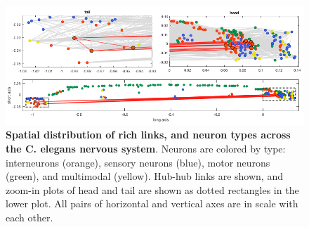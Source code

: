 \documentclass[10pt,letterpaper]{article}
\begin{document}
\begin{figure}[h]
\centering
    \includegraphics[width=1\textwidth]{SpatialPlot.png}
\caption{
\textbf{Spatial distribution of rich links, and neuron types across the C. elegans nervous system}.
Neurons are colored by type: interneurons (orange), sensory neurons (blue), motor neurons (green), and multimodal (yellow).
Hub-hub links are shown, and zoom-in plots of head and tail are shown as dotted rectangles in the lower plot.
All pairs of horizontal and vertical axes are in scale with each other.
\label{fig:S_neuronsSpace}
}
\end{figure}

\end{document}
